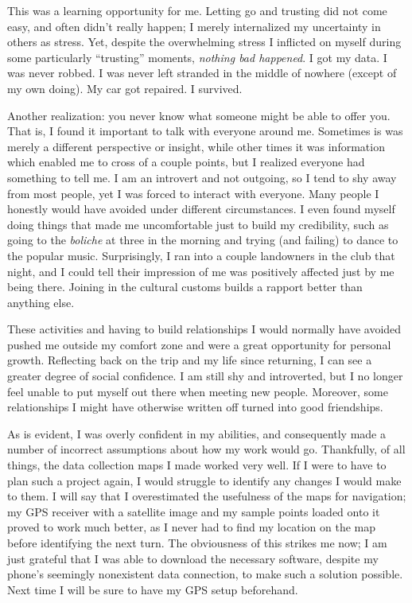 {This was a learning opportunity for me. Letting go and trusting did not come easy, and often didn’t really happen; I merely internalized my uncertainty in others as stress. Yet, despite the overwhelming stress I inflicted on myself during some particularly “trusting” moments, \textit{nothing bad happened}. I got my data. I was never robbed. I was never left stranded in the middle of nowhere (except of my own doing). My car got repaired. I survived.

Another realization: you never know what someone might be able to offer you. That is, I found it important to talk with everyone around me. Sometimes is was merely a different perspective or insight, while other times it was information which enabled me to cross of a couple points, but I realized everyone had something to tell me. I am an introvert and not outgoing, so I tend to shy away from most people, yet I was forced to interact with everyone. Many people I honestly would have avoided under different circumstances. I even found myself doing things that made me uncomfortable just to build my credibility, such as going to the \textit{boliche} at three in the morning and trying (and failing) to dance to the popular music. Surprisingly, I ran into a couple landowners in the club that night, and I could tell their impression of me was positively affected just by me being there. Joining in the cultural customs builds a rapport better than anything else.

These activities and having to build relationships I would normally have avoided pushed me outside my comfort zone and were a great opportunity for personal growth. Reflecting back on the trip and my life since returning, I can see a greater degree of social confidence. I am still shy and introverted, but I no longer feel unable to put myself out there when meeting new people. Moreover, some relationships I might have otherwise written off turned into good friendships.

As is evident, I was overly confident in my abilities, and consequently made a number of incorrect assumptions about how my work would go. Thankfully, of all things, the data collection maps I made worked very well. If I were to have to plan such a project again, I would struggle to identify any changes I would make to them. I will say that I overestimated the usefulness of the maps for navigation; my GPS receiver with a satellite image and my sample points loaded onto it proved to work much better, as I never had to find my location on the map before identifying the next turn. The obviousness of this strikes me now; I am just grateful that I was able to download the necessary software, despite my phone’s seemingly nonexistent data connection, to make such a solution possible. Next time I will be sure to have my GPS setup beforehand.

}
